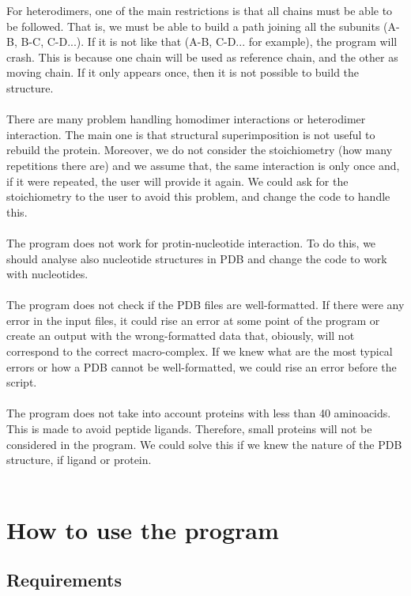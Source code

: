 \documentclass[a4paper,12pt]{report}
\begin{document}
For heterodimers, one of the main restrictions is that all chains must be able to be followed. That is, we must be able to build a path joining all the subunits (A-B, B-C, C-D...). If it is not like that (A-B, C-D... for example), the program will crash. This is because one chain will be used as reference chain, and the other as moving chain. If it only appears once, then it is not possible to build the structure.\\\\
There are many problem handling homodimer interactions or heterodimer interaction. The main one is that structural superimposition is not useful to rebuild the protein. Moreover, we do not consider the stoichiometry (how many repetitions there are) and we assume that, the same interaction is only once and, if it were repeated, the user will provide it again. We could ask for the stoichiometry to the user to avoid this problem, and change the code to handle this.\\\\
The program does not work for protin-nucleotide interaction. To do this, we should analyse also nucleotide structures in PDB and change the code to work with nucleotides.\\\\
The program does not check if the PDB files are well-formatted. If there were any error in the input files, it could rise an error at some point of the program or create an output with the wrong-formatted data that, obiously, will not correspond to the correct macro-complex. If we knew what are the most typical errors or how a PDB cannot be well-formatted, we could rise an error before the script.\\\\
The program does not take into account proteins with less than 40 aminoacids. This is made to avoid peptide ligands. Therefore, small proteins will not be considered in the program. We could solve this if we knew the nature of the PDB structure, if ligand or protein.\\\\

\chapter{How to use the program}

\section{Requirements}
\end{document}
